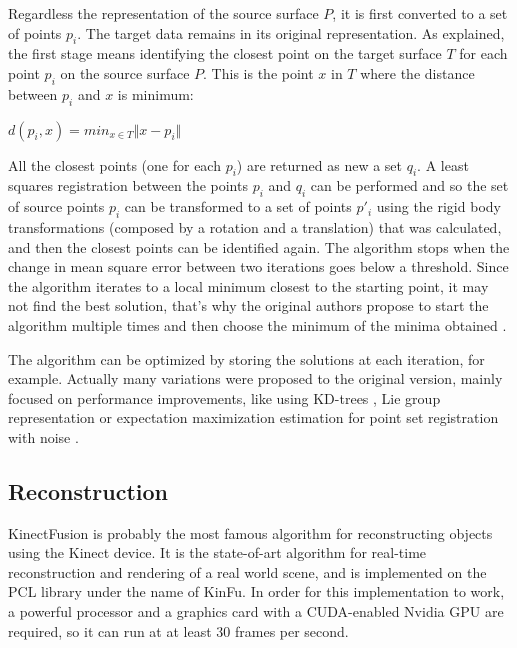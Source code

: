 \documentclass[msc, a4paper, classic, en]{ufbathesis}
\begin{document}
Regardless the representation of the source surface $P$, it is first converted to a set of points ${p_i}$. The target data remains in its original representation. As explained, the first stage means identifying the closest point on the target surface $T$ for each point $p_i$ on the source surface $P$. This is the point $x$ in $T$ where the distance between $p_i$ and $x$ is minimum:

\begin{center}
  $d(p_i, x) = min_{x \in T} \Vert x - p_i \Vert$
\end{center}

All the closest points (one for each $p_i$) are returned as new a set ${q_i}$. A least squares registration between the points $p_i$ and $q_i$ can be performed and so the set of source points $p_i$ can be transformed to a set of points $p'_i$ using the rigid body transformations (composed by a rotation and a translation) that was calculated, and then the closest points can be identified again. The algorithm stops when the change in mean square error between two iterations goes below a threshold. Since the algorithm iterates to a local minimum closest to the starting point, it may not find the best solution, that's why the original authors propose to start the algorithm multiple times and then choose the minimum of the minima obtained \cite{icp}.

The algorithm can be optimized by storing the solutions at each iteration, for example. Actually many variations were proposed to the original version, mainly focused on performance improvements, like using KD-trees \cite{zhang1994}, Lie group representation \cite{Dong201467} or expectation maximization estimation for point set registration with noise \cite{6957732}.

\subsection{Reconstruction}
\label{sec:kinfu}

KinectFusion \cite{kinfu} \cite{kinfu2} is probably the most famous algorithm for reconstructing objects using the Kinect device. It is the state-of-art algorithm for real-time reconstruction and rendering of a real world scene, and is implemented on the PCL \cite{pcl} library under the name of KinFu. In order for this implementation to work, a powerful processor and a graphics card with a CUDA-enabled Nvidia GPU are required, so it can run at at least 30 frames per second.
\end{document}
